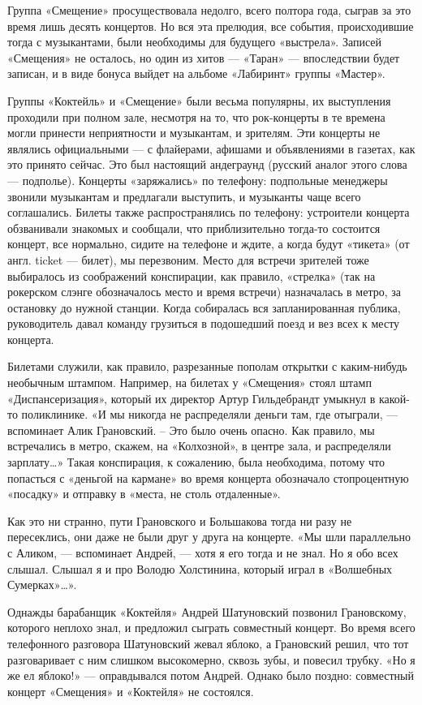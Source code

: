 \documentclass[10pt, twoside]{book}
\begin{document}
Группа «Смещение» просуществовала недолго, всего полтора года, сыграв за это время лишь десять концертов. Но вся эта
прелюдия, все события, происходившие тогда с музыкантами, были необходимы для будущего «выстрела». Записей «Смещения» не
осталось, но один из хитов — «Таран» — впоследствии будет записан, и в виде бонуса выйдет на альбоме «Лабиринт» группы
«Мастер».

Группы «Коктейль» и «Смещение» были весьма популярны, их выступления проходили при полном зале, несмотря на то, что
рок-концерты в те времена могли принести неприятности и музыкантам, и зрителям. Эти концерты не являлись официальными —
с флайерами, афишами и объявлениями в газетах, как это принято сейчас. Это был настоящий андеграунд (русский аналог
этого слова — подполье). Концерты «заряжались» по телефону: подпольные менеджеры звонили музыкантам и предлагали
выступить, и музыканты чаще всего соглашались. Билеты также распространялись по телефону: устроители концерта
обзванивали знакомых и сообщали, что приблизительно тогда-то состоится концерт, все нормально, сидите на телефоне и
ждите, а когда будут «тикета» (от англ. ticket — билет), мы перезвоним. Место для встречи зрителей тоже выбиралось из
соображений конспирации, как правило, «стрелка» (так на рокерском слэнге обозначалось место и время встречи) назначалась
в метро, за остановку до нужной станции. Когда собиралась вся запланированная публика, руководитель давал команду
грузиться в подошедший поезд и вез всех к месту концерта.

Билетами служили, как правило, разрезанные пополам открытки с каким-нибудь необычным штампом. Например, на билетах у
«Смещения» стоял штамп «Диспансеризация», который их директор Артур Гильдебрандт умыкнул в какой-то поликлинике. «И мы
никогда не распределяли деньги там, где отыграли, — вспоминает Алик Грановский. – Это было очень опасно. Как правило, мы
встречались в метро, скажем, на «Колхозной», в центре зала, и распределяли зарплату\ldots» Такая конспирация, к
сожалению, была необходима, потому что попасться с «деньгой на кармане» во время концерта обозначало стопроцентную
«посадку» и отправку в «места, не столь отдаленные».

Как это ни странно, пути Грановского и Большакова тогда ни разу не пересеклись, они даже не были друг у друга на
концерте. «Мы шли параллельно с Аликом, — вспоминает Андрей, — хотя я его тогда и не знал. Но я обо всех слышал. Слышал
я и про Володю Холстинина, который играл в «Волшебных Сумерках»\ldots».

Однажды барабанщик «Коктейля» Андрей Шатуновский позвонил Грановскому, которого неплохо знал, и предложил сыграть
совместный концерт. Во время всего телефонного разговора Шатуновский жевал яблоко, а Грановский решил, что тот
разговаривает с ним слишком высокомерно, сквозь зубы, и повесил трубку. «Но я же ел яблоко!» — оправдывался потом
Андрей. Однако было поздно: совместный концерт «Смещения» и «Коктейля» не состоялся.
\end{document}

